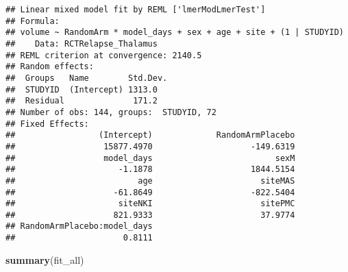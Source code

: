 \documentclass[]{article}
\newenvironment{Shaded}{\begin{snugshade}}{\end{snugshade}}
\newcommand{\KeywordTok}[1]{\textcolor[rgb]{0.13,0.29,0.53}{\textbf{#1}}}
\newcommand{\NormalTok}[1]{#1}
\theoremstyle{definition}
\theoremstyle{definition}
\theoremstyle{definition}
\theoremstyle{remark}
\begin{document}
\begin{verbatim}
## Linear mixed model fit by REML ['lmerModLmerTest']
## Formula: 
## volume ~ RandomArm * model_days + sex + age + site + (1 | STUDYID)
##    Data: RCTRelapse_Thalamus
## REML criterion at convergence: 2140.5
## Random effects:
##  Groups   Name        Std.Dev.
##  STUDYID  (Intercept) 1313.0  
##  Residual              171.2  
## Number of obs: 144, groups:  STUDYID, 72
## Fixed Effects:
##                 (Intercept)             RandomArmPlacebo  
##                  15877.4970                    -149.6319  
##                  model_days                         sexM  
##                     -1.1878                    1844.5154  
##                         age                      siteMAS  
##                    -61.8649                    -822.5404  
##                     siteNKI                      sitePMC  
##                    821.9333                      37.9774  
## RandomArmPlacebo:model_days  
##                      0.8111
\end{verbatim}

\begin{Shaded}
\begin{Highlighting}[]
  \KeywordTok{summary}\NormalTok{(fit_all)}
\end{Highlighting}
\end{Shaded}
\end{document}
